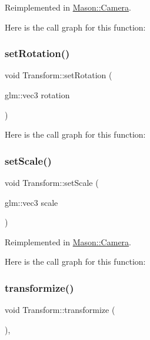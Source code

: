 Reimplemented in \hyperlink{class_mason_1_1_camera_a69f184af46d081b85209040bbe814cbb}{Mason\+::\+Camera}.

Here is the call graph for this function\+:
\hypertarget{class_mason_1_1_transform_aacc2b668bdd1d9b978aa0edccf75144a}{}\label{class_mason_1_1_transform_aacc2b668bdd1d9b978aa0edccf75144a} 
\subsubsection{\texorpdfstring{set\+Rotation()}{setRotation()}}
{\footnotesize\ttfamily void Transform\+::set\+Rotation (\begin{DoxyParamCaption}\item[{glm\+::vec3}]{rotation }\end{DoxyParamCaption})\hspace{0.3cm}{\ttfamily [virtual]}}

Here is the call graph for this function\+:
\hypertarget{class_mason_1_1_transform_a4a273ac58f45b6ee9cf2b37cf661daac}{}\label{class_mason_1_1_transform_a4a273ac58f45b6ee9cf2b37cf661daac} 
\subsubsection{\texorpdfstring{set\+Scale()}{setScale()}}
{\footnotesize\ttfamily void Transform\+::set\+Scale (\begin{DoxyParamCaption}\item[{glm\+::vec3}]{scale }\end{DoxyParamCaption})\hspace{0.3cm}{\ttfamily [virtual]}}



Reimplemented in \hyperlink{class_mason_1_1_camera_a732501ee31e862f557bbbc8ff58631a4}{Mason\+::\+Camera}.

Here is the call graph for this function\+:
\hypertarget{class_mason_1_1_transform_a4dd61568d49044377f3312397ffdafd1}{}\label{class_mason_1_1_transform_a4dd61568d49044377f3312397ffdafd1} 
\subsubsection{\texorpdfstring{transformize()}{transformize()}}
{\footnotesize\ttfamily void Transform\+::transformize (\begin{DoxyParamCaption}{ }\end{DoxyParamCaption})\hspace{0.3cm}{\ttfamily [protected]}, {\ttfamily [virtual]}}




